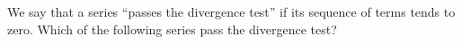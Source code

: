 \documentclass{ximera}
\begin{document}
\begin{question}
	We say that a series ``passes the divergence test'' if its sequence of terms tends to zero.  Which of the following series pass the divergence test?

\begin{multipleChoice}
\end{multipleChoice}

\end{question}
\end{document}
